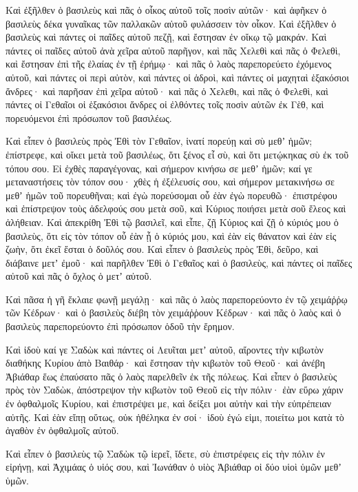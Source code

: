 {\par }{\PP {}Καὶ ἐξῆλθεν ὁ βασιλεὺς καὶ πᾶς ὁ οἶκος αὐτοῦ τοῖς ποσὶν αὐτῶν· καὶ ἀφῆκεν ὁ βασιλεὺς δέκα γυναῖκας τῶν παλλακῶν αὐτοῦ φυλάσσειν τὸν οἶκον.
Καὶ ἐξῆλθεν ὁ βασιλεὺς καὶ πάντες οἱ παῖδες αὐτοῦ πεζῇ, καὶ ἔστησαν ἐν οἴκῳ τῷ μακράν.
Καὶ πάντες οἱ παῖδες αὐτοῦ ἀνὰ χεῖρα αὐτοῦ παρῆγον, καὶ πᾶς Χελεθὶ καὶ πᾶς ὁ Φελεθὶ, καὶ ἔστησαν ἐπὶ τῆς ἐλαίας ἐν τῇ ἐρήμῳ· καὶ πᾶς ὁ λαὸς παρεπορεύετο ἐχόμενος αὐτοῦ, καὶ πάντες οἱ περὶ αὐτὸν, καὶ πάντες οἱ ἁδροὶ, καὶ πάντες οἱ μαχηταὶ ἑξακόσιοι ἄνδρες· καὶ παρῆσαν ἐπὶ χεῖρα αὐτοῦ· καὶ πᾶς ὁ Χελεθι, καὶ πᾶς ὁ Φελεθὶ, καὶ πάντες οἱ Γεθαῖοι οἱ ἑξακόσιοι ἄνδρες οἱ ἐλθόντες τοῖς ποσὶν αὐτῶν ἐκ Γὲθ, καὶ πορευόμενοι ἐπὶ πρόσωπον τοῦ βασιλέως.
\par }{\PP {}Καὶ εἶπεν ὁ βασιλεὺς πρὸς Ἐθὶ τὸν Γεθαῖον, ἱνατί πορεύῃ καὶ σὺ μεθʼ ἡμῶν; ἐπίστρεφε, καὶ οἴκει μετὰ τοῦ βασιλέως, ὅτι ξένος εἶ σὺ, καὶ ὅτι μετῴκηκας σὺ ἐκ τοῦ τόπου σου.
Εἰ ἐχθὲς παραγέγονας, καὶ σήμερον κινήσω σε μεθʼ ἡμῶν; καί γε μεταναστήσεις τὸν τόπον σου· χθὲς ἡ ἐξέλευσίς σου, καὶ σήμερον μετακινήσω σε μεθʼ ἡμῶν τοῦ πορευθῆναι; καὶ ἐγὼ πορεύσομαι οὗ ἐὰν ἐγὼ πορευθῶ· ἐπιστρέφου καὶ ἐπίστρεψον τοὺς ἀδελφούς σου μετὰ σοῦ, καὶ Κύριος ποιήσει μετὰ σοῦ ἔλεος καὶ ἀλήθειαν.
Καὶ ἀπεκρίθη Ἐθὶ τῷ βασιλεῖ, καὶ εἶπε, ζῇ Κύριος καὶ ζῇ ὁ κύριός μου ὁ βασιλεὺς, ὅτι εἰς τὸν τόπον οὗ ἐὰν ᾖ ὁ κύριός μου, καὶ ἐὰν εἰς θάνατον καὶ ἐὰν εἰς ζωὴν, ὅτι ἐκεῖ ἔσται ὁ δοῦλός σου.
Καὶ εἶπεν ὁ βασιλεὺς πρὸς Ἐθὶ, δεῦρο, καὶ διάβαινε μετʼ ἐμοῦ· καὶ παρῆλθεν Ἐθὶ ὁ Γεθαῖος καὶ ὁ βασιλεὺς, καὶ πάντες οἱ παῖδες αὐτοῦ καὶ πᾶς ὁ ὄχλος ὁ μετʼ αὐτοῦ.
\par }{\PP {}Καὶ πᾶσα ἡ γῆ ἔκλαιε φωνῇ μεγάλῃ· καὶ πᾶς ὁ λαὸς παρεπορεύοντο ἐν τῷ χειμάῤῥῳ τῶν Κέδρων· καὶ ὁ βασιλεὺς διέβη τὸν χειμάῤῥουν Κέδρων· καὶ πᾶς ὁ λαὸς καὶ ὁ βασιλεὺς παρεπορεύοντο ἐπὶ πρόσωπον ὁδοῦ τὴν ἔρημον.
\par }{\PP {}Καὶ ἰδοὺ καί γε Σαδὼκ καὶ πάντες οἱ Λευῖται μετʼ αὐτοῦ, αἴροντες τὴν κιβωτὸν διαθήκης Κυρίου ἀπὸ Βαιθάρ· καὶ ἔστησαν τὴν κιβωτὸν τοῦ Θεοῦ· καὶ ἀνέβη Ἀβιάθαρ ἕως ἐπαύσατο πᾶς ὁ λαὸς παρελθεῖν ἐκ τῆς πόλεως.
Καὶ εἶπεν ὁ βασιλεὺς πρὸς τὸν Σαδὼκ, ἀπόστρεψον τὴν κιβωτὸν τοῦ Θεοῦ εἰς τὴν πόλιν· ἐὰν εὕρω χάριν ἐν ὀφθαλμοῖς Κυρίου, καὶ ἐπιστρέψει με, καὶ δείξει μοι αὐτὴν καὶ τὴν εὐπρέπειαν αὐτῆς.
Καὶ ἐὰν εἴπῃ οὕτως, οὐκ ἠθέληκα ἐν σοί· ἰδοὺ ἐγώ εἰμι, ποιείτω μοι κατὰ τὸ ἀγαθὸν ἐν ὀφθαλμοῖς αὐτοῦ.
\par }{\PP {}Καὶ εἶπεν ὁ βασιλεὺς τῷ Σαδὼκ τῷ ἱερεῖ, ἴδετε, σὺ ἐπιστρέφεις εἰς τὴν πόλιν ἐν εἰρήνῃ, καὶ Ἀχιμάας ὁ υἱός σου, καὶ Ἰωνάθαν ὁ υἱὸς Ἀβιάθαρ οἱ δύο υἱοὶ ὑμῶν μεθʼ ὑμῶν.
}
